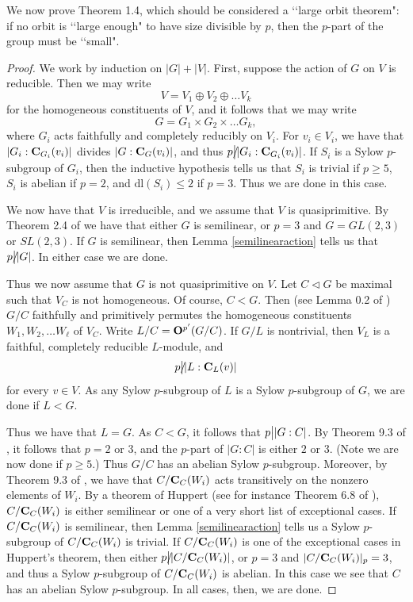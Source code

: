 \documentclass[11pt]{amsart}
\newcommand{\dl}{\mathrm {dl}}
\newcommand \dvd {\hbox {\big|}}
\newcommand \ndvd {\hbox {/}\kern-5pt\dvd}
\newcommand \nrml {\lhd}
\newcommand \cent {{\bf{C}}}
\begin{document}
We now prove Theorem 1.4, which should be considered a \lq \lq large orbit theorem": if no orbit is \lq \lq large enough" to have size divisible by $p$, then the $p$-part of the group must be \lq \lq small". 

\begin{proof}

We work by induction on $|G| + |V|$.  First, suppose the action of $G$ on $V$ is reducible.  Then we may write $$V = V_1 \oplus V_2 \oplus \ldots V_k$$ for the homogeneous constituents of $V$, and it follows that we may write $$G = G_1 \times G_2 \times \ldots G_k,$$ where $G_i$ acts faithfully and completely reducibly on $V_i$.  For $v_i \in V_i$, we have that $|G_i : \cent_{G_i}(v_i)|$ divides $|G : \cent_G(v_i)|$, and thus $p \ndvd |G_i : \cent_{G_i}(v_i)|$.  If $S_i$ is a Sylow $p$-subgroup of $G_i$, then the inductive hypothesis tells us that $S_i$ is trivial if $p \geq 5$, $S_i$ is abelian if $p =2$, and $\dl(S_i) \leq 2$ if $p = 3$.  Thus we are done in this case.


We now have that $V$ is irreducible, and we assume that $V$ is quasiprimitive.  By Theorem 2.4 of \cite{yanghuppert} we have that either $G$ is semilinear, or $p = 3$ and $G = GL(2, 3)$ or $SL(2, 3)$.  If $G$ is semilinear, then Lemma \ref{semilinearaction} tells us that $p \ndvd |G|$.  In either case we are done.

Thus we now assume that $G$ is not quasiprimitive on $V$.  Let $C \nrml G$ be maximal such that $V_C$ is not homogeneous.  Of course, $C < G$.  Then (see Lemma 0.2 of \cite{manzwolf}) $G/C$ faithfully and primitively permutes the homogeneous constituents $W_1, W_2, \ldots W_{\ell}$ of $V_C$.  Write $L/C = {\bf{O}}^{p'}(G/C)$.  If $G/L$ is nontrivial, then $V_L$ is a faithful, completely reducible $L$-module, and $$p \ndvd |L : \cent_L(v)|$$ for every $v \in V$.  As any Sylow $p$-subgroup of $L$ is a Sylow $p$-subgroup of $G$, we are done if $L < G$.

Thus we have that $L = G$.  As $C < G$, it follows that $p \dvd |G : C|$.  By Theorem 9.3 of \cite{manzwolf}, it follows that $p = 2$ or $3$, and the $p$-part of $|G : C|$ is either $2$ or $3$.  (Note we are now done if $p \geq 5$.)  Thus $G/C$ has an abelian Sylow $p$-subgroup.  Moreover, by Theorem 9.3 of \cite{manzwolf}, we have that $C/\cent_C(W_i)$ acts transitively on the nonzero elements of $W_i$.  By a theorem of Huppert (see for instance Theorem 6.8 of \cite{manzwolf}), $C/\cent_C(W_i)$ is either semilinear or one of a very short list of exceptional cases.  If $C/\cent_C(W_i)$ is semilinear, then Lemma \ref{semilinearaction} tells us a Sylow $p$-subgroup of $C/\cent_C(W_i)$ is trivial.  If $C/\cent_C(W_i)$ is one of the exceptional cases in Huppert's theorem, then either $p \ndvd |C/\cent_C(W_i)|$, or $p = 3$ and $|C/\cent_C(W_i)|_p = 3$, and thus a Sylow $p$-subgroup of $C/\cent_C(W_i)$ is abelian.  In this case we see that $C$ has an abelian Sylow $p$-subgroup.  In all cases, then, we are done. 
\end{proof}
\end{document}
